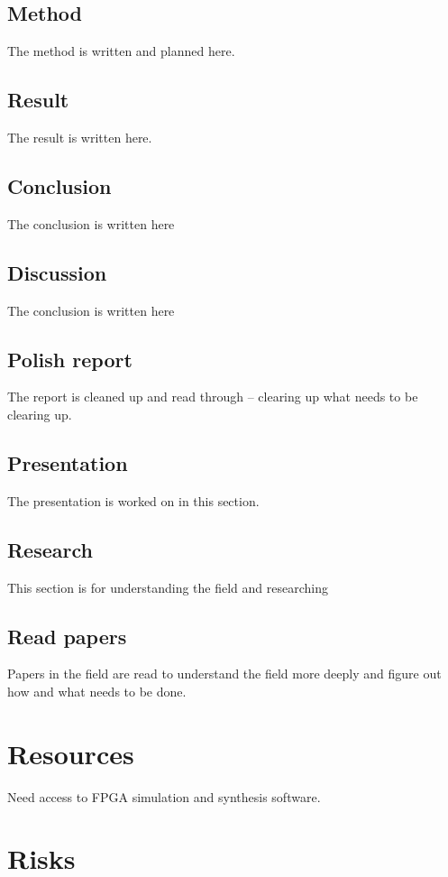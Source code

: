 \documentclass[msc,lith,english]{liuthesis}
\begin{document}
\subsection{Method}
The method is written and planned here.

\subsection{Result}
The result is written here.

\subsection{Conclusion}
The conclusion is written here

\subsection{Discussion}
The conclusion is written here

\subsection{Polish report}
The report is cleaned up and read through -- clearing up what needs to be clearing up.

\subsection{Presentation}
The presentation is worked on in this section.

\subsection{Research}
This section is for understanding the field and researching

\subsection{Read papers}
Papers in the field are read to understand the field more deeply and figure out how and what needs to be done.

\section{Resources}
Need access to FPGA simulation and synthesis software.

\section{Risks}
\end{document}
